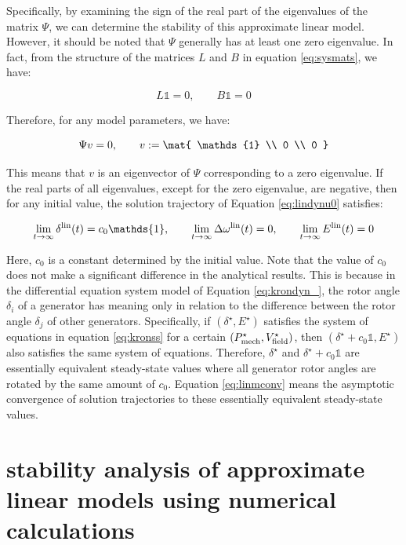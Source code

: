 \documentclass[graybox, envcountchap]{svmult}
\begin{document}
Specifically, by examining the sign of the real part of the eigenvalues of the
matrix $\Psi$, we can determine the stability of this approximate linear model.
However, it should be noted that $\Psi$ generally has at least one zero
eigenvalue. In fact, from the structure of the matrices $L$ and $B$ in equation
\ref{eq:sysmats}, we have:

\begin{equation}\label{eq:LBker}
  L  \mathds{1} = 0
  ,\qquad
  B  \mathds{1} =0
\end{equation}

Therefore, for any model parameters, we have:

\[
  \Psi v=0 ,\qquad
  v:=\mat{
    \mathds{1} \\
    0 \\
    0
  }
\]

This means that $v$ is an eigenvector of $\Psi$ corresponding to a zero
eigenvalue. If the real parts of all eigenvalues, except for the zero
eigenvalue, are negative, then for any initial value, the solution trajectory of
Equation \ref{eq:lindynu0} satisfies:

\begin{equation}\label{eq:linmconv}
  \lim_{t\rightarrow \infty}\delta^{\rm lin}(t)= c_0  \mathds{1},\qquad
  \lim_{t\rightarrow \infty}\Delta \omega^{\rm lin}(t)=0 ,\qquad
  \lim_{t\rightarrow \infty} E^{\rm lin}(t)=0
\end{equation}

Here, $c_0$ is a constant determined by the initial value. Note that the value
of $c_0$ does not make a significant difference in the analytical results. This
is because in the differential equation system model of Equation
\ref{eq:krondyn_}, the rotor angle $\delta_i$ of a generator has meaning only in
relation to the difference between the rotor angle $\delta_j$ of other
generators. Specifically, if $(\delta^{\star},E^{\star})$ satisfies the system
of equations in equation \ref{eq:kronss} for a certain $(P_{{\rm
mech}}^{\star},V_{{\rm field}}^{\star})$, then $(\delta^{\star}+c_0
\mathds{1},E^{\star})$ also satisfies the same system of equations. Therefore,
$\delta^{\star}$ and $\delta^{\star}+c_0 \mathds{1}$ are essentially equivalent
steady-state values where all generator rotor angles are rotated by the same
amount of $c_0$. Equation \ref{eq:linmconv} means the asymptotic convergence of
solution trajectories to these essentially equivalent steady-state values.

\section{stability analysis of approximate linear models using numerical
calculations}\label{sec:numlinsta}
\end{document}
